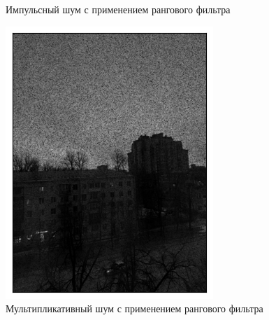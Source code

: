 \documentclass[a4paper,12pt]{article}
\begin{document}
\begin{figure}[H]
\begin{minipage}{0.49\textwidth}
        \caption{Импульсный шум с применением рангового фильтра}
    \end{minipage}\hfill
    \begin{minipage}{0.49\textwidth}
        \centering \includegraphics[width=\textwidth]{results/nlf_speckle_3.png}
        \caption{Мультипликативный шум с применением рангового фильтра}
    \end{minipage}
\end{figure}
\end{document}
